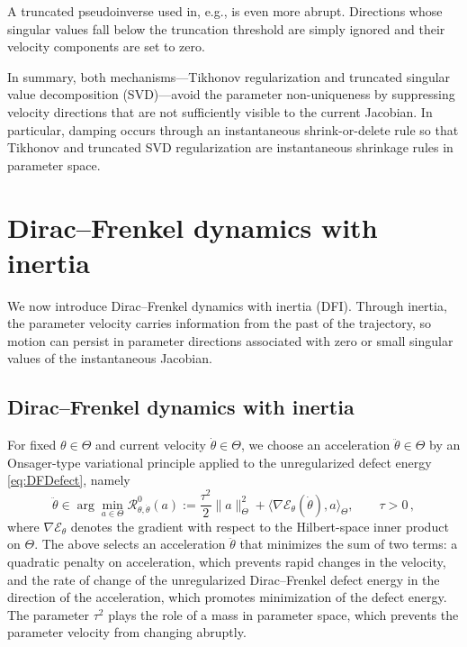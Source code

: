 \documentclass[oneside,11pt]{article}
\theoremstyle{remark}
\theoremstyle{thmstyleone}
\theoremstyle{thmstylethree}
\theoremstyle{thmstyletwo}
\newcommand{\ip}[2]{\langle #1,#2\rangle}
\newcommand{\norm}[1]{\lVert #1\rVert}
\newcommand{\mcE}{\mathcal{E}}
\newcommand{\mcR}{\mathcal{R}}
\begin{document}
A truncated pseudoinverse used in, e.g., \cite{bruna_neural_2024} is even more abrupt. Directions whose singular values fall below the truncation threshold are simply ignored and their velocity components are set to zero. 

In summary, both mechanisms---Tikhonov regularization and truncated singular value decomposition (SVD)---avoid the parameter non-uniqueness by suppressing velocity directions that are not sufficiently visible to the current Jacobian. In particular, damping occurs through an instantaneous shrink-or-delete rule so that Tikhonov and truncated SVD regularization are  instantaneous shrinkage rules in parameter space.


       

\section{Dirac--Frenkel dynamics with inertia}
We now introduce Dirac--Frenkel dynamics with inertia (DFI). Through inertia, the parameter velocity carries information from the past of the trajectory, so motion can persist in parameter directions associated with zero or small singular values of the instantaneous Jacobian. 









\subsection{Dirac--Frenkel dynamics with inertia}
\label{sec:dfo}
For fixed $\theta\in \Theta$ and current velocity $\dot \theta \in \Theta$, we choose an acceleration $\ddot \theta \in \Theta$ by an Onsager-type variational principle applied to the unregularized defect energy \eqref{eq:DFDefect}, namely
        \begin{equation}
          \ddot \theta\in\arg\min_{a\in \Theta}\mcR^0_{\theta,\dot\theta}(a):=\frac{\tau^2}{2}\norm{a}_\Theta^2+\ip{\nabla \mathcal{E}_\theta(\dot\theta)}{a}_\Theta,
          \qquad \tau>0\,,
          \label{eq:Onsager_principle_unreg}
        \end{equation}
where $\nabla \mcE_\theta$ denotes the gradient with respect to the Hilbert-space inner product on $\Theta$. 
The above selects an acceleration $\ddot \theta$ that minimizes the sum of two terms: a quadratic penalty on acceleration, which prevents rapid changes in the velocity, and the rate of change of the unregularized Dirac--Frenkel defect energy in the direction of the acceleration, which promotes minimization of the defect energy. 
The parameter $\tau^2$ plays the role of a mass in parameter space, which prevents the parameter velocity from changing abruptly. 
\end{document}
